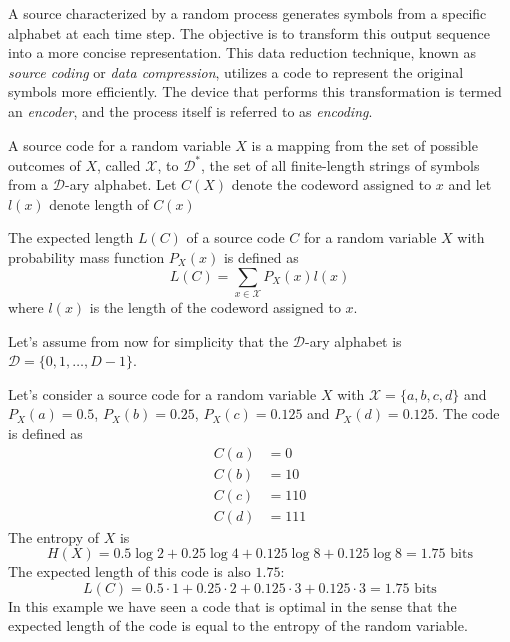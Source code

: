 A source characterized by a random process generates symbols from a specific alphabet at each time step. The objective is to transform this output sequence into a more concise representation. This data reduction technique, known as \emph{source coding} or \emph{data compression}, utilizes a code to represent the original symbols more efficiently. The device that performs this transformation is termed an \emph{encoder}, and the process itself is referred to as \emph{encoding}. \cite{han2002mathematics}

\begin{definition}\label{def:code}
    A source code for a random variable $X$ is a mapping from the set of possible outcomes of $X$, called $\mathcal{X}$, to $\mathcal{D}^*$, the set of all finite-length strings of symbols from a $\mathcal{D}$-ary alphabet. Let $C(X)$ denote the codeword assigned to $x$ and let $l(x)$ denote length of $C(x)$
\end{definition}

\begin{definition}\label{def:expected_length}
    The expected length $L(C)$ of a source code $C$ for a random variable $X$ with probability mass function $P_X(x)$ is defined as
    \begin{equation}
        L(C) = \sum_{x\in\mathcal{X}} P_X(x)l(x)
    \end{equation}
    where $l(x)$ is the length of the codeword assigned to $x$.
\end{definition}

\noindent Let's assume from now for simplicity that the $\mathcal{D}$-ary alphabet is $\mathcal{D} = \{0, 1, \ldots, D-1\}$.

\begin{example}\label{ex:source_code}
    Let's consider a source code for a random variable $X$ with $\mathcal{X} = \{a, b, c, d\}$ and $P_X(a) = 0.5$, $P_X(b) = 0.25$, $P_X(c) = 0.125$ and $P_X(d) = 0.125$. The code is defined as
    \begin{align*}
        C(a) & = 0   \\
        C(b) & = 10  \\
        C(c) & = 110 \\
        C(d) & = 111
    \end{align*}
    The entropy of $X$ is
    \begin{equation*}
        H(X) = 0.5\log 2 + 0.25\log 4 + 0.125\log 8 + 0.125\log 8 = 1.75 \text{ bits}
    \end{equation*}
    The expected length of this code is also $1.75$:
    \begin{equation*}
        L(C) = 0.5 \cdot 1 + 0.25 \cdot 2 + 0.125 \cdot 3 + 0.125 \cdot 3 = 1.75 \text{ bits}
    \end{equation*}
    In this example we have seen a code that is optimal in the sense that the expected length of the code is equal to the entropy of the random variable.
\end{example}



